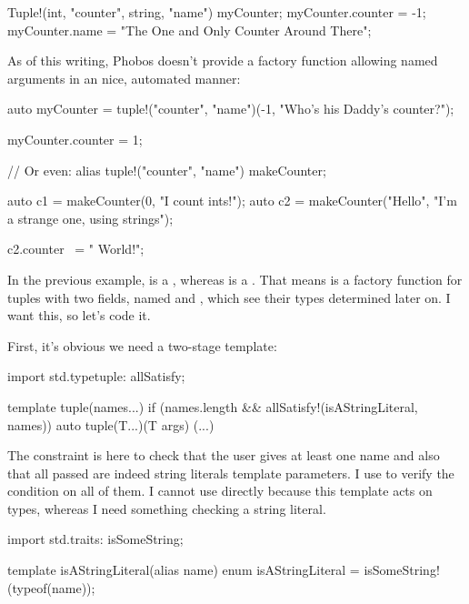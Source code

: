 \begin{dcode}
Tuple!(int, "counter", string, "name") myCounter;
myCounter.counter = -1;
myCounter.name = "The One and Only Counter Around There";
\end{dcode}

As of this writing, Phobos doesn't provide a  factory function allowing named arguments in an nice, automated manner:

\begin{dcode}
auto myCounter = tuple!("counter", "name")(-1, "Who's his Daddy's counter?");

myCounter.counter = 1;

// Or even:
alias tuple!("counter", "name") makeCounter;

auto c1 = makeCounter(0, "I count ints!");
auto c2 = makeCounter("Hello", "I'm a strange one, using strings");

c2.counter ~= " World!";
\end{dcode}

In the previous example,  is a \DD{,}\DD{)}, whereas  is a \DD{,}\DD{)}. That means  is a factory function for tuples with two fields, named  and , which see their types determined later on. I want this, so let's code it.

First, it's obvious we need a two-stage template:

\begin{dcode}
import std.typetuple: allSatisfy;

template tuple(names...) 
if (names.length && allSatisfy!(isAStringLiteral, names))
{
    auto tuple(T...)(T args)
    {
    (...)
    }
}
\end{dcode}

The constraint is here to check that the user gives at least one name and also that all passed  are indeed string literals template parameters. I use  to verify the condition on all of them. I cannot use directly  because this template acts on types, whereas I need something checking a string literal.

\begin{dcode}
import std.traits: isSomeString;

template isAStringLiteral(alias name)
{
    enum isAStringLiteral = isSomeString!(typeof(name));
}
\end{dcode}

